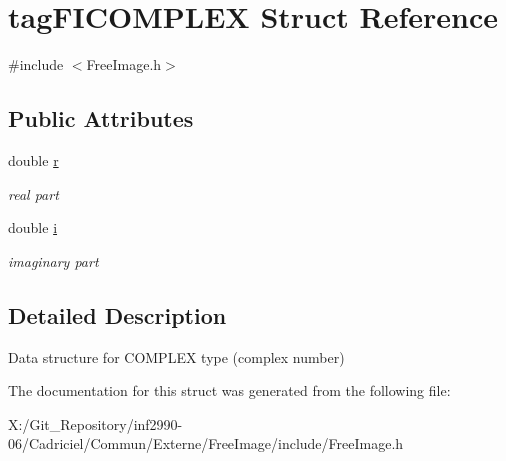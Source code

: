 \hypertarget{structtag_f_i_c_o_m_p_l_e_x}{\section{tag\-F\-I\-C\-O\-M\-P\-L\-E\-X Struct Reference}
\label{structtag_f_i_c_o_m_p_l_e_x}
}


{\ttfamily \#include $<$Free\-Image.\-h$>$}

\subsection*{Public Attributes}
\begin{DoxyCompactItemize}
\item 
\hypertarget{structtag_f_i_c_o_m_p_l_e_x_a448818f3de56c81064bdcb1ba78a7ead}{double \hyperlink{structtag_f_i_c_o_m_p_l_e_x_a448818f3de56c81064bdcb1ba78a7ead}{r}}\label{structtag_f_i_c_o_m_p_l_e_x_a448818f3de56c81064bdcb1ba78a7ead}

\begin{DoxyCompactList}\small\item\em real part \end{DoxyCompactList}\item 
\hypertarget{structtag_f_i_c_o_m_p_l_e_x_ad2cc2cc6d32c1e5496f2c77e185d8218}{double \hyperlink{structtag_f_i_c_o_m_p_l_e_x_ad2cc2cc6d32c1e5496f2c77e185d8218}{i}}\label{structtag_f_i_c_o_m_p_l_e_x_ad2cc2cc6d32c1e5496f2c77e185d8218}

\begin{DoxyCompactList}\small\item\em imaginary part \end{DoxyCompactList}\end{DoxyCompactItemize}


\subsection{Detailed Description}
Data structure for C\-O\-M\-P\-L\-E\-X type (complex number) 

The documentation for this struct was generated from the following file\-:\begin{DoxyCompactItemize}
\item 
X\-:/\-Git\-\_\-\-Repository/inf2990-\/06/\-Cadriciel/\-Commun/\-Externe/\-Free\-Image/include/Free\-Image.\-h\end{DoxyCompactItemize}
